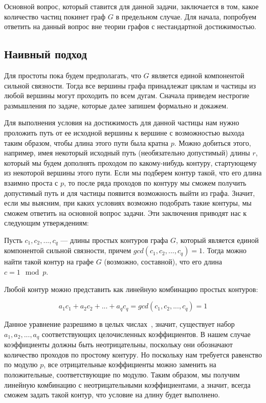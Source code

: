 	Основной вопрос, который ставится для данной задачи, заключается в том, какое количество частиц покинет граф $G$ в предельном случае. Для начала, попробуем ответить на данный вопрос вне теории графов с нестандартной достижимостью. 
	
	\subsection{Наивный подход}
	
	Для простоты пока будем предполагать, что $G$ является единой компонентой сильной связности. Тогда все вершины графа принадлежат циклам и частицы из любой вершины могут проходить по всем дугам. Сначала приведем нестрогие размышления по задаче, которые далее запишем формально и докажем. 
	
	Для выполнения условия на достижимость для данной частицы нам нужно проложить путь от ее исходной вершины к вершине с возможностью выхода таким образом, чтобы длина этого пути была кратна $p$. Можно добиться этого, например, имея некоторый исходный путь (необязательно допустимый) длины $r$, который мы будем дополнять проходом по какому-нибудь контуру, стартующему из некоторой вершины этого пути. Если мы подберем контур такой, что его длина взаимно проста с $p$, то после ряда проходов по контуру мы сможем получить допустимый путь и для частицы появится возможность выйти из графа. Значит, если мы выясним, при каких условиях возможно подобрать такие контуры, мы сможем ответить на основной вопрос задачи. Эти заключения приводят нас к следующим утверждениям:
	
	\begin{mylemma}
		Пусть $c_1, c_2, ... , c_q $ --- длины простых контуров графа $G$, который является единой компонентой сильной связности, причем $gcd(c_1, c_2, ... , c_q) = 1$. Тогда можно найти такой контур на графе $G$ (возможно, составной), что его длина $c = 1\mod p$.
	\end{mylemma}
	
	\begin{myproof}
		Любой контур можно представить как линейную комбинацию простых контуров: 
		
		\begin{equation*}
		a_1c_1 + a_2c_2 + ... + a_qc_q = gcd(c_1, c_2, ... , c_q) = 1
		\end{equation*}
		
		Данное уравнение разрешимо в целых числах~\autocite{Hasse}, значит, существует набор $a_1, a_2, ... , a_q$ соответствующих целочисленных коэффициентов. В нашем случае коэффициенты должны быть неотрицательны, поскольку они обозначают количество проходов по простому контуру. Но поскольку нам требуется равенство по модулю $p$, все отрицательные коэффициенты можно заменить на положительные, соответствующие по модулю. Таким образом, мы получим линейную комбинацию с неотрицательными коэффициентами, а значит, всегда сможем задать такой контур, что условие на длину будет выполнено. 
	\end{myproof}

